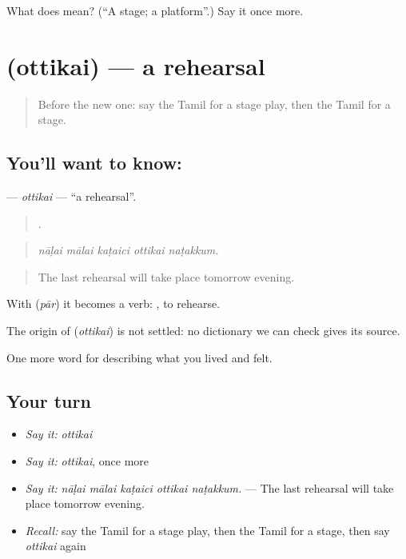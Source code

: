 \begin{tcolorbox}[breakable,colback=teal!4,colframe=teal!35!black,title={Before you move on}]
What does  mean? (\textquotedblleft{}A stage; a platform\textquotedblright{}.) Say it once more.
\end{tcolorbox}
\section[\texorpdfstring{\ta{ஒத்திகை} (ottikai)}{ஒத்திகை (ottikai)}]{ (ottikai) — a rehearsal}

\label{lesson:TA-C540-ottikai}



\begin{quote}
Before the new one: say the Tamil for a stage play, then the Tamil for a stage.
\end{quote}

\subsection*{You'll want to know: }
\textbf{} — \emph{ottikai} — \textquotedblleft{}a rehearsal\textquotedblright{}.

\begin{quote}
    .
\end{quote}

\begin{quote}
\emph{nāḷai mālai kaṭaici ottikai naṭakkum.}
\end{quote}

\begin{quote}
The last rehearsal will take place tomorrow evening.
\end{quote}

With  (\emph{pār}) it becomes a verb:  , to rehearse.

\begin{cousinweb}
The origin of \textbf{} (\emph{ottikai}) is not settled: no dictionary we can check gives its source.
\end{cousinweb}

\begin{grammarlens}[title={What you've built}]
One more word for describing what you lived and felt.
\end{grammarlens}

\subsection*{Your turn}
\begin{itemize}
\raggedright
  \item \emph{Say it:} \emph{ottikai}
  \item \emph{Say it:} \emph{ottikai}, once more
  \item \emph{Say it:} \emph{nāḷai mālai kaṭaici ottikai naṭakkum.} — The last rehearsal will take place tomorrow evening.
  \item \emph{Recall:} say the Tamil for a stage play, then the Tamil for a stage, then say \emph{ottikai} again
\end{itemize}

